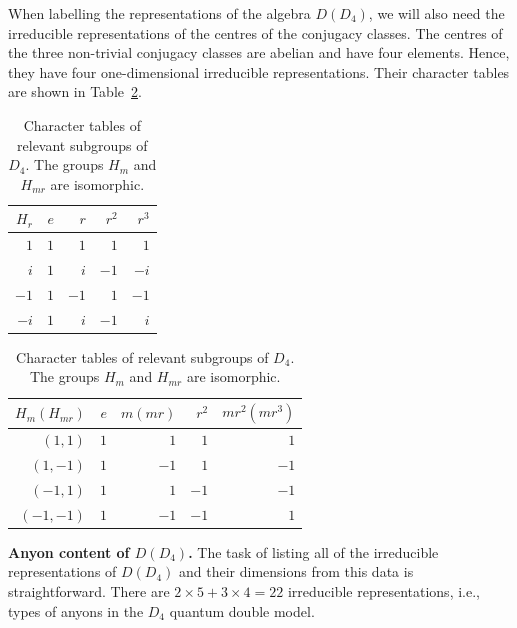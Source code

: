 \documentclass[a4paper,twocolumn,11pt]{quantumarticle}
\begin{document}
When labelling the representations of the algebra $D(D_4)$, we will also need the irreducible representations of the centres of the conjugacy classes. The centres of the three non-trivial conjugacy classes are abelian and have four elements. Hence, they have four one-dimensional irreducible representations. Their character tables are shown in Table~\ref{tab:char_sub}.
\begin{table}[h]
\centering
\begin{tabular}{|r|rrrr|}\hline
  $H_r$ & $e$ & $r$ & $r^2$ & $r^3$ \\ \hline
$1$ & $1$   & $1$            & $1$             & $1$                                  \\ 
$i$ & $1$   & $i$            & $-1$             & $-i$                                  \\ 
$-1$ & $1$   & $-1$            & $1$             & $-1$                                  \\ 
$-i$ & $1$   & $i$            & $-1$             & $i$                                  \\ \hline
\end{tabular}

\vspace{0.3cm}

\begin{tabular}{|r|rrrr|}\hline
  $H_m (H_{mr})$ & $e$ & $m(mr)$ & $r^2$ & $mr^2(mr^3)$ \\ \hline
$(1,1)$ & $1$   & $1$            & $1$             & $1$                                  \\ 
$(1,-1)$ & $1$   & $-1$            & $1$             & $-1$                                  \\ 
$(-1,1)$ & $1$   & $1$            & $-1$             & $-1$                                  \\ 
$(-1,-1)$ & $1$   & $-1$            & $-1$             & $1$                                  \\ \hline
\end{tabular}
\caption{Character tables of relevant subgroups of $D_4$. The groups $H_m$ and $H_{mr}$ are isomorphic.}
\label{tab:char_sub}
\end{table}


\textbf{Anyon content of $D(D_4)$.}
The task of listing all of the irreducible representations of $D(D_4)$ and their dimensions from this data is straightforward. There are $2 \times 5  + 3 \times 4 = 22$ irreducible representations, i.e., types of anyons in the $D_4$ quantum double model.
\end{document}
